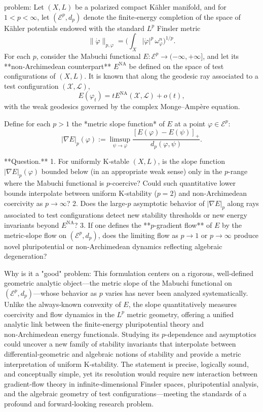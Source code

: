 problem:  
Let \((X,L)\) be a polarized compact Kähler manifold, and for \(1<p<\infty\), let \((\mathcal E^p,d_p)\) denote the finite‑energy completion of the space of Kähler potentials endowed with the standard \(L^p\) Finsler metric  
\[
\|\dot\varphi\|_{p,\varphi}=\Big(\int_X |\dot\varphi|^p\,\omega_\varphi^n\Big)^{1/p}.
\]
For each \(p\), consider the Mabuchi functional \(E:\mathcal E^p\to(-\infty,+\infty]\), and let its **non‑Archimedean counterpart** \(E^{\mathrm{NA}}\) be defined on the space of test configurations of \((X,L)\).  It is known that along the geodesic ray associated to a test configuration \((\mathcal X,\mathcal L)\),
\[
E(\varphi_t)=tE^{\mathrm{NA}}(\mathcal X,\mathcal L)+o(t),
\]
with the weak geodesics governed by the complex Monge–Ampère equation.  

Define for each \(p>1\) the *metric slope function* of \(E\) at a point \(\varphi\in\mathcal E^p\):
\[
|\nabla E|_{p}(\varphi):=\limsup_{\psi\to\varphi}\frac{[E(\varphi)-E(\psi)]_+}{d_{p}(\varphi,\psi)}.
\]
  
**Question.**
1. For uniformly K‑stable \((X,L)\), is the slope function \(|\nabla E|_{p}(\varphi)\) bounded below (in an appropriate weak sense) only in the \(p\)-range where the Mabuchi functional is \(p\)-coercive? Could such quantitative lower bounds interpolate between uniform K‑stability (\(p=2\)) and non‑Archimedean coercivity as \(p\to\infty\)?  
2. Does the large‑\(p\) asymptotic behavior of \(|\nabla E|_p\) along rays associated to test configurations detect new stability thresholds or new energy invariants beyond \(E^{\mathrm{NA}}\)?  
3. If one defines the **\(p\)-gradient flow** of \(E\) by the metric‑slope flow on \((\mathcal E^p,d_p)\), does the limiting flow as \(p\to1\) or \(p\to\infty\) produce novel pluripotential or non‑Archimedean dynamics reflecting algebraic degeneration?  

Why is it a "good" problem:  
This formulation centers on a rigorous, well‑defined geometric analytic object—the metric slope of the Mabuchi functional on \((\mathcal E^p,d_p)\)—whose behavior as \(p\) varies has never been analyzed systematically.  Unlike the always‑known convexity of \(E\), the slope quantitatively measures coercivity and flow dynamics in the \(L^p\) metric geometry, offering a unified analytic link between the finite‑energy pluripotential theory and non‑Archimedean energy functionals.  Studying its \(p\)-dependence and asymptotics could uncover a new family of stability invariants that interpolate between differential‑geometric and algebraic notions of stability and provide a metric interpretation of uniform K‑stability.  The statement is precise, logically sound, and conceptually simple, yet its resolution would require new interaction between gradient‑flow theory in infinite‑dimensional Finsler spaces, pluripotential analysis, and the algebraic geometry of test configurations—meeting the standards of a profound and forward‑looking research problem.